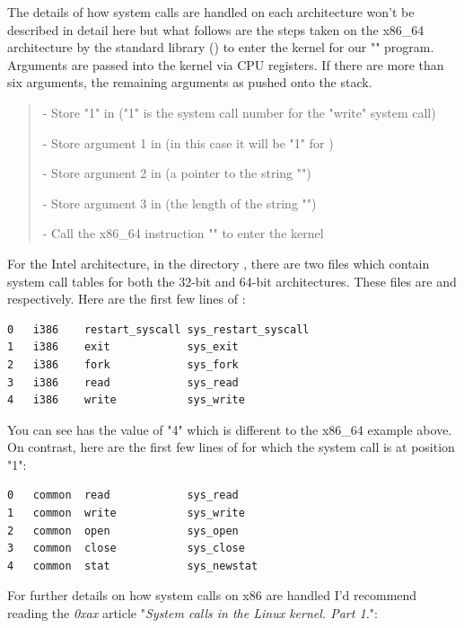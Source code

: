 The details of how system calls are handled on each architecture won't be described in detail here but what follows are the steps taken on the x86\_64 architecture by the standard library () to enter the kernel for our "" program. Arguments are passed into the kernel via CPU registers. If there are more than six arguments, the remaining arguments as pushed onto the stack.

\begin{quote}
- Store "1" in  ("1" is the system call number for the "write" system call)

- Store argument 1 in  (in this case it will be "1" for )

- Store argument 2 in  (a pointer to the string "")

- Store argument 3 in  (the length of the string "")

- Call the x86\_64 instruction "" to enter the kernel
\end{quote}

\noindent
For the Intel architecture, in the directory , there are two files which contain system call tables for both the 32-bit and 64-bit architectures. These files are  and  respectively. Here are the first few lines of :

\begin{lstlisting}
0   i386    restart_syscall sys_restart_syscall
1   i386    exit            sys_exit
2   i386    fork            sys_fork
3   i386    read            sys_read
4   i386    write           sys_write
\end{lstlisting}

\noindent
You can see  has the value of "4" which is different to the x86\_64 example above. On contrast, here are the first few lines of  for which the  system call is at position "1":

\begin{lstlisting}
0   common  read            sys_read
1   common  write           sys_write
2   common  open            sys_open
3   common  close           sys_close
4   common  stat            sys_newstat
\end{lstlisting}

\noindent
For further details on how system calls on x86 are handled I'd recommend reading the \textit{0xax} article "\textit{System calls in the Linux kernel. Part 1.}":

